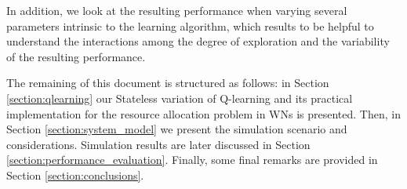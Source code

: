 \documentclass[conference]{IEEEtran}
\begin{document}
	In addition, we look at the resulting performance when varying several parameters intrinsic to the learning algorithm, which results to be helpful to understand the interactions among the degree of exploration and the variability of the resulting performance. 
	
	The remaining of this document is structured as follows: in Section \ref{section:qlearning} our Stateless variation of Q-learning and its practical implementation for the resource allocation problem in WNs is presented. Then, in Section \ref{section:system_model} we present the simulation scenario and considerations. Simulation results are later discussed in Section \ref{section:performance_evaluation}. Finally, some final remarks are provided in Section \ref{section:conclusions}. 
	
\end{document}
